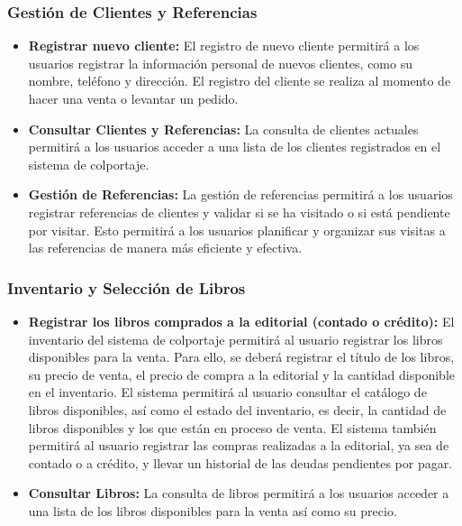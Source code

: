 \documentclass[runningheads]{llncs}
\begin{document}
                \subsubsection{Gestión de Clientes y Referencias}
                    \begin{itemize}
                        \item \textbf{Registrar nuevo cliente: }El registro de nuevo cliente permitirá a los usuarios registrar la información personal de nuevos clientes, como su nombre, teléfono y dirección. El registro del cliente se realiza al momento de hacer una venta o levantar un pedido.
                        \item \textbf{Consultar Clientes y Referencias: }La consulta de clientes actuales permitirá a los usuarios acceder a una lista de los clientes registrados en el sistema de colportaje.
                        \item \textbf{Gestión de Referencias: }La gestión de referencias permitirá a los usuarios registrar referencias de clientes y validar si se ha visitado o si está pendiente por visitar. Esto permitirá a los usuarios planificar y organizar sus visitas a las referencias de manera más eficiente y efectiva.
                    \end{itemize}   
                \subsubsection{Inventario y Selección de Libros}
                    \begin{itemize}
                        \item \textbf{Registrar los libros comprados a la editorial (contado o crédito): }El inventario del sistema de colportaje permitirá al usuario registrar los libros disponibles para la venta. Para ello, se deberá registrar el título de los libros, su precio de venta, el precio de compra a la editorial y la cantidad disponible en el inventario. El sistema permitirá al usuario consultar el catálogo de libros disponibles, así como el estado del inventario, es decir, la cantidad de libros disponibles y los que están en proceso de venta. El sistema también permitirá al usuario registrar las compras realizadas a la editorial, ya sea de contado o a crédito, y llevar un historial de las deudas pendientes por pagar.
                        \item \textbf{Consultar Libros: }La consulta de libros permitirá a los usuarios acceder a una lista de los libros disponibles para la venta así como su precio.
                    \end{itemize}
\end{document}
